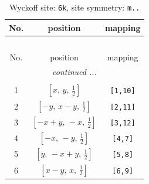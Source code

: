 \documentclass[fleqn,8pt]{jsarticle}
\begin{document}
\renewcommand{\arraystretch}{1.2}
\begin{longtable}{ccc}
\caption{Wyckoff site: {\tt 6k}, site symmetry: {\tt m..}}
 \\
 \hline \hline
No. & position & mapping \\ \hline \endfirsthead

\multicolumn{2}{l}{\tablename\ \thetable{}} \\
 \hline \hline
No. & position & mapping \\ \hline \endhead

 \hline \hline
\multicolumn{2}{r}{\footnotesize\it continued ...} \\ \endfoot

 \hline \hline
\multicolumn{2}{r}{} \\ \endlastfoot

1 & $\left[ x,\, y,\, \frac{1}{2} \right]$ & {\tt [1,10]} \\ \hline
2 & $\left[ - y,\, x - y,\, \frac{1}{2} \right]$ & {\tt [2,11]} \\ \hline
3 & $\left[ - x + y,\, - x,\, \frac{1}{2} \right]$ & {\tt [3,12]} \\ \hline
4 & $\left[ - x,\, - y,\, \frac{1}{2} \right]$ & {\tt [4,7]} \\ \hline
5 & $\left[ y,\, - x + y,\, \frac{1}{2} \right]$ & {\tt [5,8]} \\ \hline
6 & $\left[ x - y,\, x,\, \frac{1}{2} \right]$ & {\tt [6,9]} \\
\end{longtable}
\renewcommand{\arraystretch}{1.2}
\end{document}
